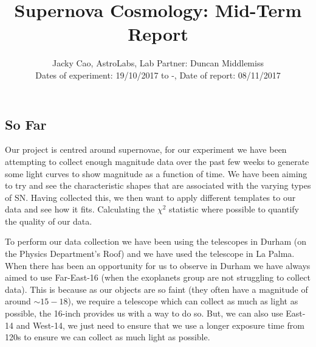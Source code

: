 \documentclass[twocolumn]{revtex4}
\begin{document}
\textheight=26.385cm

\title{Supernova Cosmology: Mid-Term Report}
 
\author{Jacky Cao, AstroLabs, Lab Partner: Duncan Middlemiss \\ Dates of experiment: 19/10/2017 to -, Date of report: 08/11/2017}
\maketitle
\vspace{-3ex}
\subsection*{So Far} 
\vspace{-2ex}

Our project is centred around supernovae, for our experiment we have been attempting to collect enough magnitude data over the past few weeks to generate some light curves to show magnitude as a function of time. We have been aiming to try and see the characteristic shapes that are associated with the varying types of SN. Having collected this, we then want to apply different templates to our data and see how it fits. Calculating the $\chi^2$ statistic where possible to quantify the quality of our data.

To perform our data collection we have been using the telescopes in Durham (on the Physics Department's Roof) and we have used the telescope in La Palma. When there has been an opportunity for us to observe in Durham we have always aimed to use Far-East-16 (when the exoplanets group are not struggling to collect data). This is because as our objects are so faint (they often have a magnitude of around $\sim 15 - 18$), we require a telescope which can collect as much as light as possible, the 16-inch provides us with a way to do so. But, we can also use East-14 and West-14, we just need to ensure that we use a longer exposure time from 120s to ensure we can collect as much light as possible. 
\end{document}

